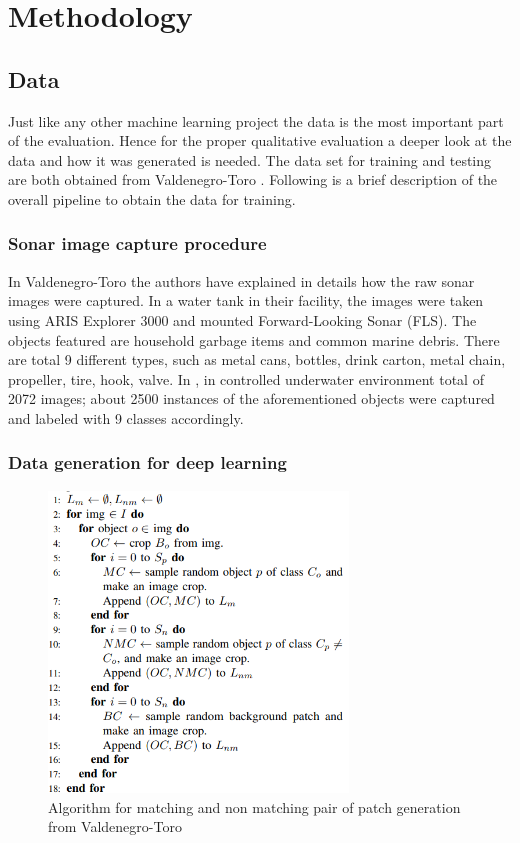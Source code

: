 \chapter{Methodology}
\label{chap:method}
\section{Data}
Just like any other machine learning project the data is the most important part of the evaluation. Hence for the proper qualitative evaluation a deeper look at the data and how it was generated is needed.
The data set for training and testing are both obtained from Valdenegro-Toro \cite{stateoftheart}. Following is a brief description of the overall pipeline to obtain the data for training.

\subsection{Sonar image capture procedure}
In Valdenegro-Toro \cite{stateoftheart} the authors have explained in details how the raw sonar images were captured. In a water tank in their facility, the images were taken using ARIS Explorer 3000 and
mounted Forward-Looking Sonar (FLS). The objects featured are household garbage items and common marine debris. There are total 9 different types, such as metal cans, bottles, drink carton, metal chain, propeller, tire, hook, valve. 
In \cite{stateoftheart}, in controlled underwater environment total of 2072 images; about 2500 instances of the aforementioned objects were captured and labeled with 9 classes accordingly.

\subsection{Data generation for deep learning}
\begin{figure}[ht]
\centering
\includegraphics[height= 8cm]{images/densenet/training_data_generation}
\caption{Algorithm for matching and non matching pair of patch generation from Valdenegro-Toro \cite{stateoftheart}}
\label{fig:training_data_generation}
\end{figure}

